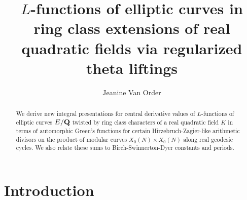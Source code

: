 \documentclass{amsart}
\theoremstyle{definition}
\begin{document}
\title[$L$-functions of elliptic curves over real ring class fields]{$L$-functions of elliptic curves in ring class extensions of real quadratic fields via regularized theta liftings}

\author{Jeanine Van Order }
\address{Departamento de Matem\'atica, Pontif\'icia Universidade Cat\'olica do Rio de Janeiro (PUC-Rio)}

\begin{abstract} We derive new integral presentations for central derivative values of $L$-functions of elliptic curves $E/{\bf{Q}}$ twisted by ring class characters of a real quadratic field $K$ 
in terms of automorphic Green's functions for certain Hirzebruch-Zagier-like arithmetic divisors on the product of modular curves $X_0(N) \times X_0(N)$ along real geodesic cycles. 
We also relate these sums to Birch-Swinnerton-Dyer constants and periods. \end{abstract}

\maketitle

\tableofcontents

\section{Introduction}
\end{document}
